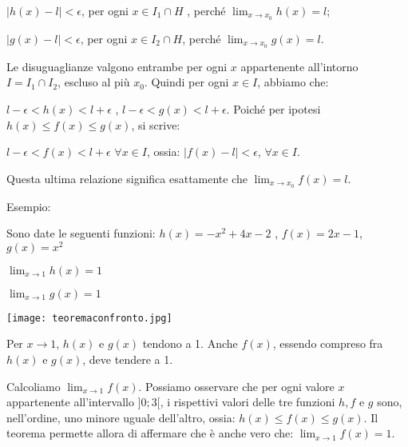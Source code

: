 \documentclass[a4paper,11pt]{article}
\begin{document}
$\vert h(x) - l \vert < \epsilon$, per ogni $x \in I_1 \cap H$ , perché $\lim_{x \to x_0} h(x)=l$;

\vspace{1mm}

$\vert g(x) - l \vert < \epsilon$, per ogni $x \in I_2 \cap H$, perché $\lim_{x \to x_0} g(x)=l$.

Le disuguaglianze valgono entrambe per ogni $x $ appartenente all'intorno $I= I_1 \cap I_2$, escluso al più $x_0$. Quindi per ogni $x \in I$, abbiamo che:

$l - \epsilon < h(x) < l + \epsilon$ \hspace{2mm} , \hspace{2mm}
$l - \epsilon < g(x) < l + \epsilon$.
\hspace{3mm}
Poiché per ipotesi $h(x) \leqslant f(x) \leqslant g(x)$, si scrive:

$l - \epsilon < f(x) < l+ \epsilon$ $\forall x \in I$, ossia:
$\vert f(x) - l \vert < \epsilon $, $\forall x \in I$.
\hspace{5mm}

Questa ultima relazione significa esattamente che $\lim_{x \to x_0} f(x)=l$.

\vspace{1mm}

Esempio:

Sono date le seguenti funzioni:
$h(x)=-x^2 + 4x -2$ , $f(x)=2x-1$, $g(x)=x^2$
\hspace{2mm}
\begin{minipage}{3cm}
\begin{small}
$\lim_{x \to 1 } h(x)=1$ 

\hspace{1mm}

$\lim_{x \to 1 } g(x)=1$
\end{small}
\end{minipage}

\vspace{1mm}

\begin{minipage}{4.5cm}
\texttt{[image: teoremaconfronto.jpg]}
\end{minipage}
\begin{minipage}{10cm}
Per $x \to 1$, $h(x)$ e $g(x)$ tendono a 1. Anche $f(x)$, essendo compreso fra $h(x)$ e $g(x)$, deve tendere a 1.

Calcoliamo $\lim_{x \to 1 } f(x)$. Possiamo osservare che per ogni valore $x$ appartenente all'intervallo $]0;3[$, i rispettivi valori delle tre funzioni $h,f$ e $g$ sono, nell'ordine, uno minore uguale dell'altro, ossia: $h(x) \leqslant f(x) \leqslant g(x)$. Il teorema permette allora di affermare che è anche vero che: $\lim_{x \to 1} f(x)=1$.
\end{minipage}
\end{document}

